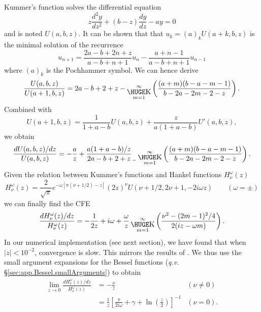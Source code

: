 Kummer's function solves the differential equation \cite[\S13.1.1]{ABR1965}
  \begin{equation}
    z\frac{d^2y}{dz^2}+(b-z)\frac{dy}{dz}-ay=0
  \end{equation}
and is noted $U(a,b,z)$. It can be shown that that $u_k=(a)_kU(a+k,b,z)$
is the minimal solution of the recurrence \cite{TEM1983}
  \begin{equation}
    u_{n+1} = \frac{2a-b+2n+z}{a-b+n+1}u_n - \frac{a+n-1}{a-b+n+1}u_{n-1}
  \end{equation}
where $(a)_k$ is the Pochhammer symbol. We can hence derive
  \begin{equation}
    \frac{U(a,b,z)}{U(a+1,b,z)} = 2a-b+2+z-\bigk_{m=1}^\infty\left(\frac{(a+m)(b-a-m-1)}{b-2a-2m-2-z}\right).
  \end{equation}
Combined with \cite[\S13.4.23]{ABR1965}
  \begin{equation}
    U(a+1,b,z) = \frac{1}{1+a-b}U(a,b,z) + \frac{z}{a(1+a-b)}U'(a,b,z), 
  \end{equation}
we obtain \cite{CUY2008}
  \begin{equation}
    \frac{dU(a,b,z)/dz}{U(a,b,z)} = -\frac{a}{z}+\frac{a(1+a-b)/z}{2a-b+2+z}_{-}\bigk_{m=1}^\infty\left(\frac{(a+m)(b-a-m-1)}{b-2a-2m-2-z}\right).
  \end{equation}
Given the relation between Kummer's functions and Hankel functions $H^\omega_{\nu}(z)$ \cite[\S13.6.22/23]{ABR1965}
  \begin{equation}
    H^\omega_\nu(z) = \frac{2}{\sqrt{\pi}}e^{-\omega\left[\pi\left(\nu+1/2\right)-z\right]}(2z)^\nu U(\nu+1/2,2\nu+1,-2i\omega z)\qquad (\omega=\pm)
  \end{equation}
we can finally find the CFE
  \begin{equation}
    \label{eq:app.numTools.cfeHankel}
    \frac{dH^\omega_\nu(z)/dz}{H^\omega_\nu(z)} = -\frac{1}{2z}+i\omega+\frac{\omega}{z}\bigk_{m=1}^\infty\left(\frac{\nu^2-(2m-1)^2/4}{2(iz-\omega m)}\right).
  \end{equation}
In our numerical implementation (see next section), we have found that when $|z|<10^{-2}$, convergence is slow. This mirrors the results of \cite{THO1986}.
We thus use the small argument expansions for the Bessel functions (\textit{q.v.} \S \ref{sec:app.Bessel.smallArguments}) to obtain
  \begin{subequations}
  \begin{align}
   \lim_{z\rightarrow0}\frac{dH^\omega_\nu(z)/dz}{H^\omega_\nu(z)}	&= -\frac{\nu}{z}	& (\nu\neq0)	\\
									&= \frac{1}{z}\left[\frac{\pi}{2i\omega}+\gamma+\ln\left(\frac{z}{2}\right)\right]^{-1} & (\nu=0).
  \end{align}
  \end{subequations}

